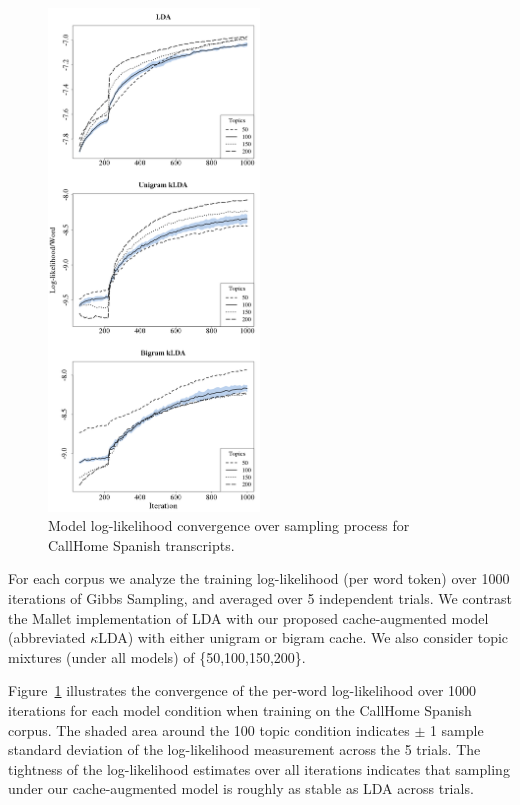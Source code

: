 \begin{figure}
\begin{center}
\includegraphics[width=0.5\textwidth]{graphs/ch6/ll/chsp-lda-ll.png}
\end{center}
\caption[Log-likelihood convergence, CallHome Spanish]{Model log-likelihood convergence over sampling process for CallHome Spanish transcripts.\label{fig6:llCallHome}}
\end{figure}

For each corpus we analyze the training log-likelihood (per word token) over 1000 iterations of Gibbs Sampling, and averaged over 5 independent trials.  We contrast the Mallet implementation of LDA with our proposed cache-augmented model (abbreviated $\kappa$LDA) with either unigram or bigram cache.  We also consider topic mixtures (under all models) of \{50,100,150,200\}.  

Figure~\ref{fig6:llCallHome} illustrates the convergence of the per-word log-likelihood over 1000 iterations for each model condition when training on the CallHome Spanish corpus.  The shaded area around the 100 topic condition indicates $\pm$ 1 sample standard deviation of the log-likelihood measurement across the 5 trials.   The tightness of the log-likelihood estimates over all iterations indicates that sampling under our cache-augmented model is roughly as stable as LDA across trials.  

